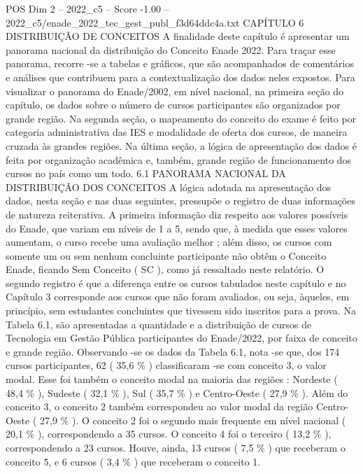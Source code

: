 \begin{textsample}{POS Dim 2 – 2022\_c5 – Score -1.00 – 2022\_c5/enade\_2022\_tec\_gest\_publ\_f3d64ddc4a.txt}  \label{ex:f2_pos_223}
CAPÍTULO 6 DISTRIBUIÇÃO DE CONCEITOS A finalidade deste capítulo é apresentar um panorama nacional da distribuição do Conceito Enade 2022.
Para traçar esse panorama, recorre -se a tabelas e gráficos, que são acompanhados de comentários e análises que contribuem para a contextualização dos dados neles expostos.
Para visualizar o panorama do Enade/2002, em nível nacional, na primeira seção do capítulo, os dados sobre o número de cursos participantes são organizados por grande região.
Na segunda seção, o mapeamento do conceito do exame é feito por categoria administrativa das IES e modalidade de oferta dos cursos, de maneira cruzada às grandes regiões.
Na última seção, a lógica de apresentação dos dados é feita por organização acadêmica e, também, grande região de funcionamento dos cursos no país como um todo. 6.1 PANORAMA NACIONAL DA DISTRIBUIÇÃO DOS CONCEITOS A lógica adotada na apresentação dos dados, nesta seção e nas duas seguintes, pressupõe o registro de duas informações de natureza reiterativa.
A primeira informação diz respeito aos valores possíveis do Enade, que variam em níveis de 1 a 5, sendo que, à medida que esses valores aumentam, o curso recebe uma avaliação melhor ; além disso, os cursos com somente um ou sem nenhum concluinte participante não obtêm o Conceito Enade, ficando Sem Conceito ( SC ), como já ressaltado neste relatório.
O segundo registro é que a diferença entre os cursos tabulados neste capítulo e no Capítulo 3 corresponde aos cursos que não foram avaliados, ou seja, àqueles, em princípio, sem estudantes concluintes que tivessem sido inscritos para a prova.
Na Tabela 6.1, são apresentadas a quantidade e a distribuição de cursos de Tecnologia em Gestão Pública participantes do Enade/2022, por faixa de conceito e grande região.
Observando -se os dados da Tabela 6.1, nota -se que, dos 174 cursos participantes, 62 ( 35,6 \% ) classificaram -se com conceito 3, o valor modal.
Esse foi também o conceito modal na maioria das regiões : Nordeste ( 48,4 \% ), Sudeste ( 32,1 \% ), Sul ( 35,7 \% ) e Centro-Oeste ( 27,9 \% ).
Além do conceito 3, o conceito 2 também correspondeu ao valor modal da região Centro-Oeste ( 27,9 \% ).
O conceito 2 foi o segundo mais frequente em nível nacional ( 20,1 \% ), correspondendo a 35 cursos.
O conceito 4 foi o terceiro ( 13,2 \% ), correspondendo a 23 cursos.
Houve, ainda, 13 cursos ( 7,5 \% ) que receberam o conceito 5, e 6 cursos ( 3,4 \% ) que receberam o conceito 1.

\end{textsample}

